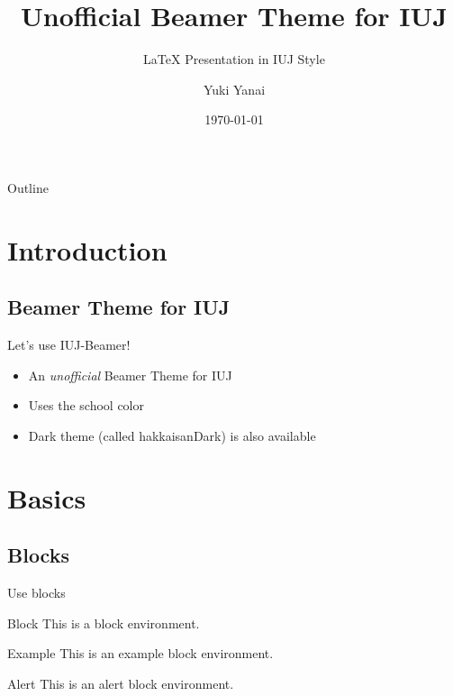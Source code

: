 \documentclass[dvipdfmx]{beamer}
\title{Unofficial Beamer Theme for IUJ}
\subtitle{{\LaTeX} Presentation in IUJ Style}
\author[Yanai]{Yuki Yanai}
\institute[IUJ]{Graduate School of International Relations}
\date{\today}
\begin{document}
\begin{frame}
 \maketitle
\end{frame}

\begin{frame}{Outline} 
  \tableofcontents
\end{frame}

\section{Introduction}

  \subsection{Beamer Theme for IUJ}

\begin{frame}{Let's use IUJ-Beamer!}
  \begin{itemize}
   \item An \textit{unofficial} Beamer Theme for IUJ
   \item Uses the school color
   \item Dark theme (called hakkaisanDark) is also available
  \end{itemize}
\end{frame}





\section{Basics}


\subsection{Blocks}

\begin{frame}{Use blocks}
  \begin{block}{Block}
   This is a block environment.
  \end{block}
  \pause
  \begin{exampleblock}{Example}
   This is an example block environment.
  \end{exampleblock}
 \pause
  \begin{alertblock}{Alert}
   This is an alert block environment.
  \end{alertblock}
\end{frame}
\end{document}
